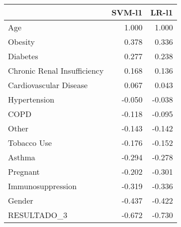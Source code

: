 \begin{tabular}{lrr}
\toprule
{} &  SVM-l1 &  LR-l1 \\
\midrule
Age                         &   1.000 &  1.000 \\
Obesity                     &   0.378 &  0.336 \\
Diabetes                    &   0.277 &  0.238 \\
Chronic Renal Insufficiency &   0.168 &  0.136 \\
Cardiovascular Disease      &   0.067 &  0.043 \\
Hypertension                &  -0.050 & -0.038 \\
COPD                        &  -0.118 & -0.095 \\
Other                       &  -0.143 & -0.142 \\
Tobacco Use                 &  -0.176 & -0.152 \\
Asthma                      &  -0.294 & -0.278 \\
Pregnant                    &  -0.202 & -0.301 \\
Immunosuppression           &  -0.319 & -0.336 \\
Gender                      &  -0.437 & -0.422 \\
RESULTADO\_3                 &  -0.672 & -0.730 \\
\bottomrule
\end{tabular}

